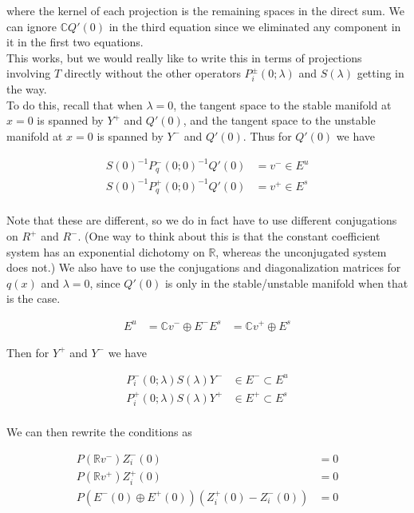 \documentclass[12pt]{article}
\def\R{{\mathbb R}}
\def\C{{\mathbb C}}
\begin{document}
where the kernel of each projection is the remaining spaces in the direct sum. We can ignore $\C Q'(0)$ in the third equation since we eliminated any component in it in the first two equations.\\

This works, but we would really like to write this in terms of projections involving $T$ directly without the other operators $P_i^\pm(0; \lambda)$ and $S(\lambda)$ getting in the way.\\

To do this, recall that when $\lambda = 0$, the tangent space to the stable manifold at $x = 0$ is spanned by $Y^+$ and $Q'(0)$, and the tangent space to the unstable manifold at $x = 0$ is spanned by $Y^-$ and $Q'(0)$. Thus for $Q'(0)$ we have

\begin{align*}
S(0)^{-1} P_q^-(0; 0)^{-1} Q'(0) &= v^- \in E^u \\
S(0)^{-1} P_q^+(0; 0)^{-1} Q'(0) &= v^+ \in E^s \\
\end{align*}

Note that these are different, so we do in fact have to use different conjugations on $R^+$ and $R^-$. (One way to think about this is that the constant coefficient system has an exponential dichotomy on $\R$, whereas the unconjugated system does not.) We also have to use the conjugations and diagonalization matrices for $q(x)$ and $\lambda = 0$, since $Q'(0)$ is only in the stable/unstable manifold when that is the case.

\begin{align*}
E^u &= \C v^- \oplus E^-
E^s &= \C v^+ \oplus E^s
\end{align*}

Then for $Y^+$ and $Y^-$ we have

\begin{align*}
P_i^-(0; \lambda) S(\lambda) Y^- &\in E^- \subset E^u \\
P_i^+(0; \lambda) S(\lambda) Y^+ &\in E^+ \subset E^s \\
\end{align*}

We can then rewrite the conditions as

\begin{align*}
P(\R v^- ) Z_i^-(0) &= 0 \\
P(\R v^+ ) Z_i^+(0) &= 0 \\
P( E^-(0) \oplus E^+(0) ) ( Z_i^+(0) - Z_i^-(0) ) &= 0
\end{align*}
\end{document}
